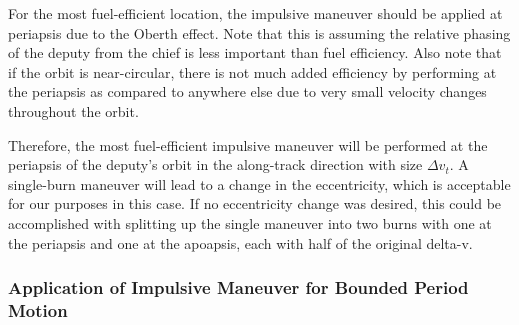 For the most fuel-efficient location, the impulsive maneuver should be applied at periapsis due to the Oberth effect. Note that this is assuming the relative phasing of the deputy from the chief is less important than fuel efficiency. Also note that if the orbit is near-circular, there is not much added efficiency by performing at the periapsis as compared to anywhere else due to very small velocity changes throughout the orbit.

Therefore, the most fuel-efficient impulsive maneuver will be performed at the periapsis of the deputy's orbit in the along-track direction with size $\Delta v_t$. A single-burn maneuver will lead to a change in the eccentricity, which is acceptable for our purposes in this case. If no eccentricity change was desired, this could be accomplished with splitting up the single maneuver into two burns with one at the periapsis and one at the apoapsis, each with half of the original delta-v. 

\subsubsection{Application of Impulsive Maneuver for Bounded Period Motion}

